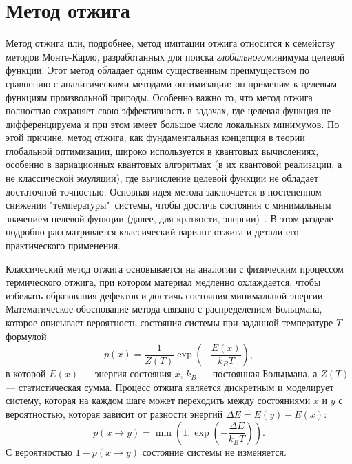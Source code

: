 \documentclass[a4paper]{report}
\begin{document}
\section{Метод отжига}\label{MethAnn}

Метод отжига или, подробнее, метод имитации отжига относится к семейству методов Монте-Карло, разработанных для поиска \textit{глобального}\linebreak минимума целевой функции. Этот метод обладает одним существенным преимуществом по сравнению с аналитическими методами оптимизации: он применим к целевым функциям произвольной природы. Особенно важно то, что метод отжига полностью сохраняет свою эффективность в задачах, где целевая функция не дифференцируема и при этом имеет большое число локальных минимумов. По этой причине, метод отжига, как фундаментальная концепция в теории глобальной оптимизации, широко используется в квантовых вычислениях, особенно в вариационных квантовых алгоритмах (в их квантовой реализации, а не классической эмуляции), где вычисление целевой функции не обладает достаточной точностью. Основная идея метода заключается в постепенном снижении "температуры"\, системы, чтобы достичь состояния с минимальным значением целевой функции (далее, для краткости, энергии)~\cite{Salamon2002, Lopatin2005}. В этом разделе подробно рассматривается классический вариант отжига и детали его практического применения.

Классический метод отжига основывается на аналогии с физическим процессом термического отжига, при котором материал медленно охлаждается, чтобы избежать образования дефектов и достичь состояния минимальной энергии. Математическое обоснование метода связано с распределением Больцмана, которое описывает вероятность состояния системы при заданной температуре $T$ формулой
\begin{equation}
p(x) = \frac{1}{Z(T)} \exp\left(-\frac{E(x)}{k_B T}\right), \nonumber
\end{equation}
в которой $E(x)$ — энергия состояния $x$, $k_B$ — постоянная Больцмана, а $Z(T)$ — статистическая сумма. Процесс отжига является дискретным и моделирует систему, которая на каждом шаге может переходить между состояниями $x$ и $y$ с вероятностью, которая зависит от разности энергий $\Delta E= E(y)-E(x)$:
\begin{equation}\label{prob}
p(x\rightarrow y) = \min\left(1, \exp\left(-\frac{\Delta E}{k_B T}\right)\right).
\end{equation}
С вероятностью $1-p(x\rightarrow y)$ состояние системы не изменяется.
\end{document}
